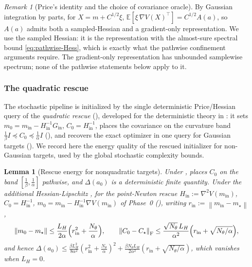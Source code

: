 \documentclass[11pt]{article}
\theoremstyle{plain}
\newtheorem{lemma}[lemma]{Lemma}
\theoremstyle{definition}
\theoremstyle{remark}
\newtheorem{remark}[remark]{Remark}
\newcommand{\E}{\mathbb{E}}
\newcommand{\Id}{I}
\newcommand{\Frob}{\mathrm{F}}
\newcommand{\norm}[1]{\left\lVert #1\right\rVert}
\newcommand{\LH}{L_H}
\begin{document}
\begin{remark}[Price's identity and the choice of covariance oracle]
\label{rem:price}
By Gaussian integration by parts, for $X=m+C^{1/2}\xi$, $\E[\xi\,\nabla V(X)^\top]=C^{1/2}A(a)$, so
$A(a)$ admits both a sampled-Hessian and a gradient-only representation. We use the sampled Hessian:
it is the representation with the almost-sure spectral bound \eqref{eq:pathwise-Hess}, which is
exactly what the pathwise confinement arguments require. The gradient-only representation has
unbounded samplewise spectrum; none of the pathwise statements below apply to it.
\end{remark}

\subsubsection{The quadratic rescue}
\label{subsec:rescue}

The stochastic pipeline is initialized by the single deterministic Price/Hessian query of the
\emph{quadratic rescue} (), developed for the deterministic theory in
: it sets $m_0=m_{\mathrm{in}}-H_{\mathrm{in}}^{-1}G_{\mathrm{in}}$,
$C_0=H_{\mathrm{in}}^{-1}$, places the covariance on the curvature band
$\tfrac1\beta\Id\preceq C_0\preceq\tfrac1\alpha\Id$ (), and recovers the exact
optimizer in one query for Gaussian targets (). We record here the energy
quality of the rescued initializer for non-Gaussian targets, used by the global stochastic
complexity bounds.

\begin{lemma}[Rescue energy for nonquadratic targets]
\label{lem:rescue-energy}
Under ,  places $C_0$ on the band
$[\tfrac1\beta,\tfrac1\alpha]$ pathwise, and $\Delta(a_0)$ is a deterministic finite quantity. Under
the additional Hessian-Lipschitz , for the point-Newton rescue
$H_{\mathrm{in}}:=\nabla^2V(m_{\mathrm{in}})$, $C_0=H_{\mathrm{in}}^{-1}$,
$m_0=m_{\mathrm{in}}-H_{\mathrm{in}}^{-1}\nabla V(m_{\mathrm{in}})$ of Phase~0
(), writing $r_{\mathrm{in}}:=\norm{m_{\mathrm{in}}-m_\star}$,
\[
    \norm{m_0-m_\star}\leq\frac{\LH}{2\alpha}\Bigl(r_{\mathrm{in}}^2+\frac{N_\theta}\alpha\Bigr),
    \qquad
    \norm{C_0-C_\star}_{\Frob}\leq\frac{\sqrt{N_\theta}\,\LH}{\alpha^2}\Bigl(r_{\mathrm{in}}+\sqrt{N_\theta/\alpha}\Bigr),
\]
and hence
$\Delta(a_0)\leq\tfrac{\beta\LH^2}{8\alpha^2}(r_{\mathrm{in}}^2+\tfrac{N_\theta}\alpha)^2+\tfrac{\beta N_\theta\LH}{2\alpha^2}(r_{\mathrm{in}}+\sqrt{N_\theta/\alpha})$,
which vanishes when $\LH=0$.
\end{lemma}
\end{document}

